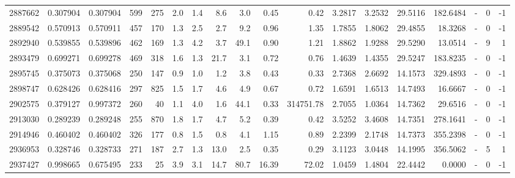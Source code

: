 \begin{tabular}{rrrrrrrrrrrrrrrlrr}
   2887662 & 0.307904 &   0.307904 &  599 &  275 &      2.0 &      1.4 &     8.6 &      3.0 &       0.45 &        0.42 &  3.2817 &  3.2532 &   29.5116 &  182.6484 &             - &        0 &         -1 \\
   2889542 & 0.570913 &   0.570911 &  457 &  170 &      1.3 &      2.5 &     2.7 &      9.2 &       0.96 &        1.35 &  1.7855 &  1.8062 &   29.4855 &   18.3268 &             - &        0 &         -1 \\
   2892940 & 0.539855 &   0.539896 &  462 &  169 &      1.3 &      4.2 &     3.7 &     49.1 &       0.90 &        1.21 &  1.8862 &  1.9288 &   29.5290 &   13.0514 &             - &        9 &          1 \\
   2893479 & 0.699271 &   0.699278 &  469 &  318 &      1.6 &      1.3 &    21.7 &      3.1 &       0.72 &        0.76 &  1.4639 &  1.4355 &   29.5247 &  183.8235 &             - &        0 &         -1 \\
   2895745 & 0.375073 &   0.375068 &  250 &  147 &      0.9 &      1.0 &     1.2 &      3.8 &       0.43 &        0.33 &  2.7368 &  2.6692 &   14.1573 &  329.4893 &             - &        0 &         -1 \\
   2898747 & 0.628426 &   0.628416 &  297 &  825 &      1.5 &      1.7 &     4.6 &      4.9 &       0.67 &        0.72 &  1.6591 &  1.6513 &   14.7493 &   16.6667 &             - &        0 &         -1 \\
   2902575 & 0.379127 &   0.997372 &  260 &   40 &      1.1 &      4.0 &     1.6 &     44.1 &       0.33 &   314751.78 &  2.7055 &  1.0364 &   14.7362 &   29.6516 &             - &        0 &         -1 \\
   2913030 & 0.289239 &   0.289248 &  255 &  870 &      1.8 &      1.7 &     4.7 &      5.2 &       0.39 &        0.42 &  3.5252 &  3.4608 &   14.7351 &  278.1641 &             - &        0 &         -1 \\
   2914946 & 0.460402 &   0.460402 &  326 &  177 &      0.8 &      1.5 &     0.8 &      4.1 &       1.15 &        0.89 &  2.2399 &  2.1748 &   14.7373 &  355.2398 &             - &        0 &         -1 \\
   2936953 & 0.328746 &   0.328733 &  271 &  187 &      2.7 &      1.3 &    13.0 &      2.5 &       0.35 &        0.29 &  3.1123 &  3.0448 &   14.1995 &  356.5062 &             - &        5 &          1 \\
   2937427 & 0.998665 &   0.675495 &  233 &   25 &      3.9 &      3.1 &    14.7 &     80.7 &      16.39 &       72.02 &  1.0459 &  1.4804 &   22.4442 &    0.0000 &             - &        0 &         -1 \\

\end{tabular}
